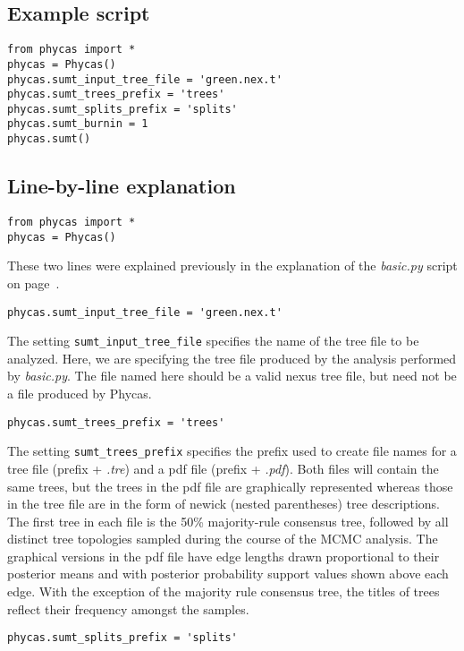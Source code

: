 \documentclass[10pt]{article}
\newcommand{\pathname}[1]{{\em #1}}
\newcommand{\setting}[1]{{\tt \small #1}\index{#1}}
\begin{document}
\subsection{Example script}

\begin{verbatim}
from phycas import *
phycas = Phycas()
phycas.sumt_input_tree_file = 'green.nex.t'
phycas.sumt_trees_prefix = 'trees'
phycas.sumt_splits_prefix = 'splits'
phycas.sumt_burnin = 1
phycas.sumt()
\end{verbatim}

\subsection{Line-by-line explanation}

\begin{verbatim}
from phycas import *
phycas = Phycas()
\end{verbatim}
%
These two lines were explained previously in the explanation of the \pathname{basic.py} script on page~\pageref{subsec:basicpyexplanation}.
%
\begin{verbatim}
phycas.sumt_input_tree_file = 'green.nex.t'
\end{verbatim}
%
The setting \setting{sumt\_input\_tree\_file} specifies the name of the tree file to be analyzed. Here, we are specifying the tree file produced by the analysis performed by \pathname{basic.py}. The file named here should be a valid nexus tree file, but need not be a file produced by Phycas.
%
\begin{verbatim}
phycas.sumt_trees_prefix = 'trees'
\end{verbatim}
%
The setting \setting{sumt\_trees\_prefix} specifies the prefix used to create file names for a tree file (prefix + \pathname{.tre}) and a pdf file (prefix + \pathname{.pdf}). Both files will contain the same trees, but the trees in the pdf file are graphically represented whereas those in the tree file are in the form of newick (nested parentheses) tree descriptions. The first tree in each file is the 50\% majority-rule consensus tree, followed by all distinct tree topologies sampled during the course of the MCMC analysis. The graphical versions in the pdf file have edge lengths drawn proportional to their posterior means and with posterior probability support values shown above each edge. With the exception of the majority rule consensus tree, the titles of trees reflect their frequency amongst the samples. 
%
\begin{verbatim}
phycas.sumt_splits_prefix = 'splits'
\end{verbatim}
\end{document}

